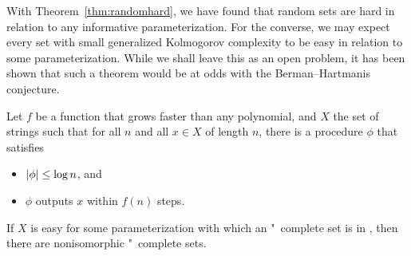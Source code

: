 With Theorem~\ref{thm:randomhard}, we have found that random sets are hard in relation to any informative parameterization.
For the converse, we may expect every set with small generalized Kolmogorov complexity to be easy in relation to some parameterization.
While we shall leave this as an open problem, it has been shown that such a theorem would be at odds with the Berman--Hartmanis conjecture.
\begin{theorem}
  Let $f$ be a function that grows faster than any polynomial, and $X$ the set of strings such that for all $n$ and all $x \in X$ of length $n$, there is a procedure $\phi$ that satisfies
  \begin{itemize}
  \item ${\lvert\phi\rvert} \le \log n$, and
  \item $\phi$ outputs $x$ within $f(n)$ steps.
  \end{itemize}
  If $X$ is easy for some parameterization with which an "~complete set is in , then there are nonisomorphic "~complete sets.
\end{theorem}
